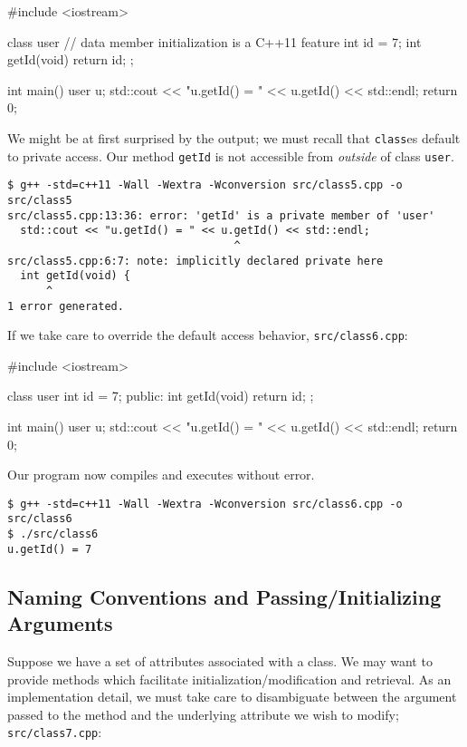 \documentclass[12pt,letterpaper,twoside]{article}
\begin{document}
\begin{cpp}
#include <iostream>

class user {
  // data member initialization is a C++11 feature
  int id = 7;
  int getId(void) { return id; }
};

int main() {
  user u;
  std::cout << "u.getId() = " << u.getId() << std::endl;
  return 0;
}
\end{cpp}

We might be at first surprised by the output; we must recall that 
\texttt{class}es default to private access. Our method \texttt{getId} is
not accessible from \emph{outside} of class \texttt{user}.

\begin{verbatim}
$ g++ -std=c++11 -Wall -Wextra -Wconversion src/class5.cpp -o src/class5
src/class5.cpp:13:36: error: 'getId' is a private member of 'user'
  std::cout << "u.getId() = " << u.getId() << std::endl;
                                   ^
src/class5.cpp:6:7: note: implicitly declared private here
  int getId(void) {
      ^
1 error generated.
\end{verbatim}

If we take care to override the default access behavior,
\texttt{src/class6.cpp}:

\begin{cpp}
#include <iostream>

class user {
  int id = 7;
 public:
  int getId(void) { return id; }
};

int main() {
  user u;
  std::cout << "u.getId() = " << u.getId() << std::endl;
  return 0;
}
\end{cpp}

Our program now compiles and executes without error.
\begin{verbatim}
$ g++ -std=c++11 -Wall -Wextra -Wconversion src/class6.cpp -o src/class6
$ ./src/class6
u.getId() = 7
\end{verbatim}

\subsection{Naming Conventions and Passing/Initializing Arguments}
Suppose we have a set of attributes associated with a class. We may want
to provide methods which facilitate initialization/modification and retrieval.
As an implementation detail, we must take care to disambiguate 
between the argument passed to the method and the underlying attribute we
wish to modify;
\texttt{src/class7.cpp}:
\end{document}
